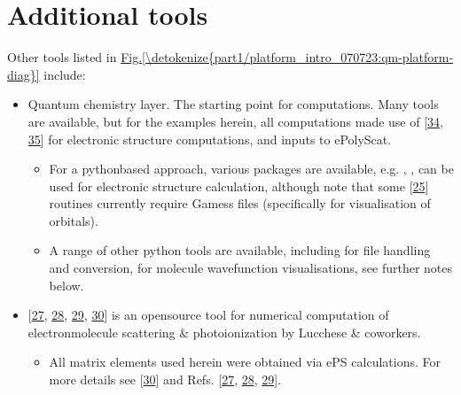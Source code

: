 \documentclass[letterpaper,table,10pt,english]{jupyterBook}
\begin{document}
\section{Additional tools}
\label{\detokenize{part1/platform_intro_070723:additional-tools}}\label{\detokenize{part1/platform_intro_070723:sect-platform-othertools}}
\sphinxAtStartPar
Other tools listed in \hyperref[\detokenize{part1/platform_intro_070723:qm-platform-diag}]{Fig.\@ \ref{\detokenize{part1/platform_intro_070723:qm-platform-diag}}} include:
\begin{itemize}
\item {} 
\sphinxAtStartPar
Quantum chemistry layer. The starting point for  computations. Many tools are available, but for the examples herein, all computations made use of  {[}\hyperlink{cite.backmatter/bibliography:id611}{34}, \hyperlink{cite.backmatter/bibliography:id622}{35}{]} for electronic structure computations, and inputs to ePolyScat.
\begin{itemize}
\item {} 
\sphinxAtStartPar
For a python\sphinxhyphen{}based approach, various packages are available, e.g. , ,  can be used for electronic structure calculation, although note that some  {[}\hyperlink{cite.backmatter/bibliography:id597}{25}{]} routines currently require Gamess files (specifically for visualisation of orbitals).

\item {} 
\sphinxAtStartPar
A range of other python tools are available, including  for file handling and conversion,  for molecule wavefunction visualisations, see further notes below.

\end{itemize}

\item {} 
\sphinxAtStartPar
{} {[}\hyperlink{cite.backmatter/bibliography:id747}{27}, \hyperlink{cite.backmatter/bibliography:id617}{28}, \hyperlink{cite.backmatter/bibliography:id786}{29}, \hyperlink{cite.backmatter/bibliography:id750}{30}{]} is an open\sphinxhyphen{}source tool for numerical computation of electron\sphinxhyphen{}molecule scattering \& photoionization by Lucchese \& coworkers.
\begin{itemize}
\item {} 
\sphinxAtStartPar
All matrix elements used herein were obtained via ePS calculations. For more details see  {[}\hyperlink{cite.backmatter/bibliography:id750}{30}{]} and Refs. {[}\hyperlink{cite.backmatter/bibliography:id747}{27}, \hyperlink{cite.backmatter/bibliography:id617}{28}, \hyperlink{cite.backmatter/bibliography:id786}{29}{]}.


\end{itemize}
\end{itemize}
\end{document}
